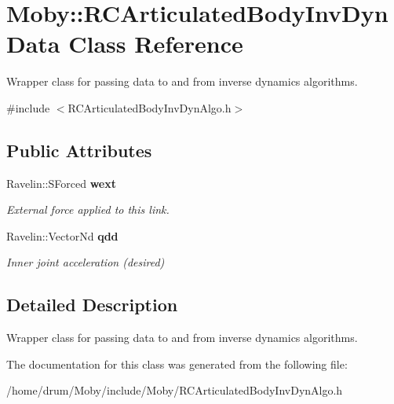 \section{Moby\-:\-:R\-C\-Articulated\-Body\-Inv\-Dyn\-Data Class Reference}
\label{classMoby_1_1RCArticulatedBodyInvDynData}


Wrapper class for passing data to and from inverse dynamics algorithms.  




{\ttfamily \#include $<$R\-C\-Articulated\-Body\-Inv\-Dyn\-Algo.\-h$>$}

\subsection*{Public Attributes}
\begin{DoxyCompactItemize}
\item 
Ravelin\-::\-S\-Forced {\bf wext}\label{classMoby_1_1RCArticulatedBodyInvDynData_ae9364585293b12472b1ea9f95cffa1de}

\begin{DoxyCompactList}\small\item\em External force applied to this link. \end{DoxyCompactList}\item 
Ravelin\-::\-Vector\-Nd {\bf qdd}\label{classMoby_1_1RCArticulatedBodyInvDynData_a258a1da2fbd02c1b4aae0b5ac1a4c6ea}

\begin{DoxyCompactList}\small\item\em Inner joint acceleration (desired) \end{DoxyCompactList}\end{DoxyCompactItemize}


\subsection{Detailed Description}
Wrapper class for passing data to and from inverse dynamics algorithms. 

The documentation for this class was generated from the following file\-:\begin{DoxyCompactItemize}
\item 
/home/drum/\-Moby/include/\-Moby/R\-C\-Articulated\-Body\-Inv\-Dyn\-Algo.\-h\end{DoxyCompactItemize}
